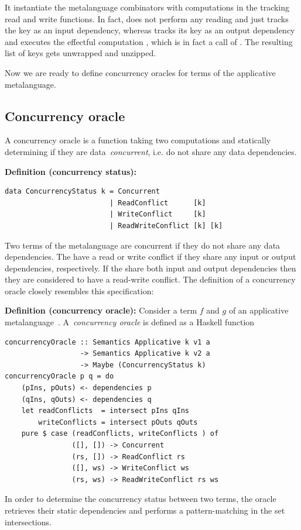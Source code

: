 It instantiate the metalanguage combinators with computations in the tracking read
and write functions. In fact,  does not perform any reading and just tracks
the key as an input dependency, whereas  tracks its key as
an output dependency and executes the effectful computation , which is
in fact a call of . The resulting list of keys gets unwrapped and
unzipped.

Now we are ready to define concurrency oracles for terms of the
applicative metalanguage.

\newpage
\subsection{Concurrency oracle}
A concurrency oracle is a function taking two computations and statically
determining if they are data~\emph{concurrent}, i.e. do not share any
data dependencies.


\textbf{Definition (concurrency status):\label{def:concurrency-status}}
\begin{verbatim}
data ConcurrencyStatus k = Concurrent
                         | ReadConflict      [k]
                         | WriteConflict     [k]
                         | ReadWriteConflict [k] [k]
\end{verbatim}

\noindent Two terms of the metalanguage are concurrent if they do not share any data dependencies.
The have a read or write conflict if they share any input or output dependencies,
respectively. If the share both input and output dependencies then they are considered to
have a read-write conflict. The definition of a concurrency oracle closely resembles
this specification:

\textbf{Definition (concurrency oracle):\label{def:oracle}}
Consider a term $f$ and $g$ of an applicative metalanguage~.
A~\emph{concurrency oracle} is defined as a Haskell function
\begin{verbatim}
concurrencyOracle :: Semantics Applicative k v1 a
                  -> Semantics Applicative k v2 a
                  -> Maybe (ConcurrencyStatus k)
concurrencyOracle p q = do
    (pIns, pOuts) <- dependencies p
    (qIns, qOuts) <- dependencies q
    let readConflicts  = intersect pIns qIns
        writeConflicts = intersect pOuts qOuts
    pure $ case (readConflicts, writeConflicts ) of
                ([], []) -> Concurrent
                (rs, []) -> ReadConflict rs
                ([], ws) -> WriteConflict ws
                (rs, ws) -> ReadWriteConflict rs ws

\end{verbatim}
In order to determine the concurrency status between two terms, the oracle
retrieves their static dependencies and performs a pattern-matching in the
set intersections.

